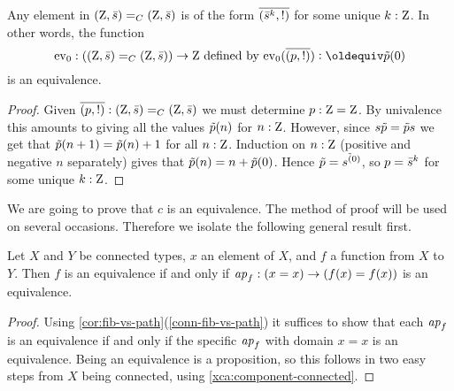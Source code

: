 \begin{lemma}
  \label{lem:IdCisZet}
Any element in $(\mathrm{Z},\bar {s})=_C(\mathrm{Z},\bar {s})$ is of 
the form $\overline{({\bar {s}^k},{!})}$ for some unique $k:\mathrm{Z}$.  
In other words, the function 
\[
\ev_0:((\zet,\etop{s})=_C(\zet,\etop{s}))\to \zet 
\text{~defined by~} \ev_0(\pathpair{p}{!}) \defeq \ptoe{p}(0)
\]
is an equivalence.
\end{lemma}
\begin{proof}
  Given $\overline{({p},{!})}:(\mathrm{Z},\bar {s})=_C(\mathrm{Z},\bar {s})$ we must determine 
$p:\mathrm{Z}=\mathrm{Z}$. By univalence this amounts to giving all the values 
$\tilde {p}(n)$ for $n:\mathrm{Z}$.  However, since $s\tilde {p}=\tilde {p}s$ we 
get that $\tilde {p}(n+1)=\tilde {p}(n)+1$ for all $n:\mathrm{Z}$. 
Induction on $n:\mathrm{Z}$ (positive and negative $n$ separately) gives that 
$\tilde {p}(n)=n+\tilde {p}(0)$. Hence $\tilde {p}=s^{\tilde {(}0)}$, so $p=\bar {s}^k$
for some unique $k:\mathrm{Z}$.
\end{proof}

We are going to prove that $c$ is an equivalence.
The method of proof will be used on several occasions.
Therefore we isolate the following general result first.

\begin{lemma}\label{lem:conn-eq-f-ap-f-x}
Let $X$ and $Y$ be connected types, $x$ an element of $X$,
and $f$ a function from $X$ to $Y$. Then $f$ is an equivalence
if and only if $\mathop{{\it ap}_{f}}: (x=x) \to (f(x)=f(x))$ is an equivalence.
\end{lemma} 
\begin{proof}
Using \cref{cor:fib-vs-path}(\ref{conn-fib-vs-path}) it suffices to show that 
each $\mathop{{\it ap}_{f}}$ is an equivalence if and only if the specific $\mathop{{\it ap}_{f}}$ with 
domain $x=x$ is an equivalence. Being an equivalence is a proposition, 
so this follows in two easy steps from $X$ being connected,
using \cref{xca:component-connected}.
\end{proof}

